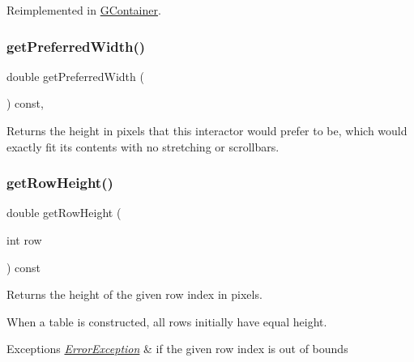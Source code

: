 Reimplemented in \mbox{\hyperlink{classGContainer_a21904b305edacd8f871d6951cb8d3fa5}{G\+Container}}.

\mbox{\label{classGInteractor_a82bca31d37700fb0e35d2743352efd5e}} 
\subsubsection{\texorpdfstring{get\+Preferred\+Width()}{getPreferredWidth()}}
{\footnotesize\ttfamily double get\+Preferred\+Width (\begin{DoxyParamCaption}{ }\end{DoxyParamCaption}) const\hspace{0.3cm}{\ttfamily [virtual]}, {\ttfamily [inherited]}}



Returns the height in pixels that this interactor would prefer to be, which would exactly fit its contents with no stretching or scrollbars. 

\mbox{\label{classGTable_a0215a742506665475b721ed12913808b}} 
\subsubsection{\texorpdfstring{get\+Row\+Height()}{getRowHeight()}}
{\footnotesize\ttfamily double get\+Row\+Height (\begin{DoxyParamCaption}\item[{int}]{row }\end{DoxyParamCaption}) const\hspace{0.3cm}{\ttfamily [virtual]}}



Returns the height of the given row index in pixels. 

When a table is constructed, all rows initially have equal height. 
\begin{DoxyExceptions}{Exceptions}
{\em \mbox{\hyperlink{classErrorException}{Error\+Exception}}} & if the given row index is out of bounds \\
\hline
\end{DoxyExceptions}
\mbox{\label{classGTable_ae4b79399eefc964f783f06b6959a6a4a}} 
